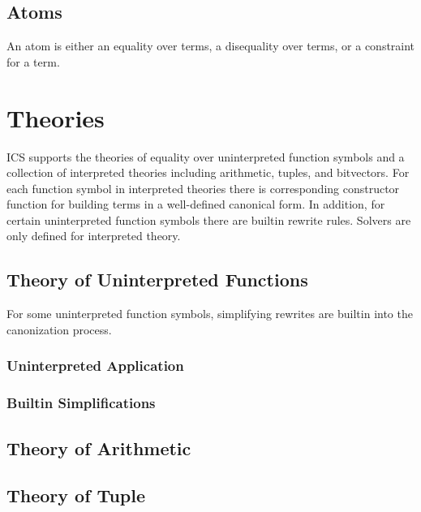 \documentclass[12pt]{article}
\begin{document}
 \subsection{Atoms}\label{subsec:atoms}
   An atom is either an equality over terms, a disequality
   over terms, or a constraint for a term.
   
    


\section{Theories}\label{sec:theories}
  ICS supports the theories of equality over uninterpreted
  function symbols and a collection of interpreted theories
  including arithmetic, tuples, and bitvectors.  For each
  function symbol in interpreted theories there is corresponding
  constructor function for building terms in a well-defined
  canonical form.  In addition, for certain uninterpreted
  function symbols there are builtin rewrite rules.  Solvers
  are only defined for interpreted theory.

\subsection{Theory of Uninterpreted Functions}\label{sec:uninterpreted}

  For some uninterpreted function symbols, simplifying
  rewrites are builtin into the canonization process.

  \subsubsection{Uninterpreted Application}
    
    

  \subsubsection{Builtin Simplifications}
    
    


 \subsection{Theory of Arithmetic}\label{subsec:arithmetic}

    
    


 \subsection{Theory of Tuple}\label{subsec:tuples}
\end{document}
